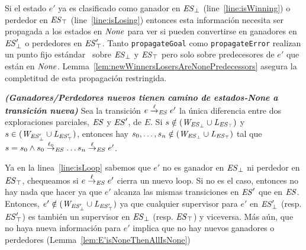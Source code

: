 Si el estado $e'$ ya es clasificado como ganador en
$\mathit{\mathit{ES}_{\bot}}$ (line~\ref{line:isWinning}) o
perdedor en $\mathit{\mathit{ES}_{\top}}$ (line~\ref{line:isLosing}) 
entonces esta información necesita ser propagada a los estados en $\mathit{None}$ para ver si pueden convertirse en ganadores en 
$\mathit{\mathit{ES}'_{\bot}}$ o perdedores en
$\mathit{\mathit{ES}'_{\top}}$. Tanto \texttt{propagateGoal} como
\texttt{propagateError} realizan un punto fijo estándar~\cite{Ramadge:1989:CDES} sobre
$\mathit{\mathit{ES}_{\bot}}$ y
$\mathit{\mathit{ES}_{\top}}$ pero solo sobre predecesores de $e'$ que están en $\mathit{None}$. 
Lemma~\ref{lem:newWinnersLosersAreNonePredecessors} asegura la completitud de esta propagación restringida.

\begin{lemma}\textbf{\emph{(Ganadores/Perdedores nuevos tienen camino de estados-\textit{None} a transición nueva)}}
\label{lem:newWinnersLosersAreNonePredecessors}
Sea la transición $e \overset{\ell}{\rightarrow}_{\mathit{ES}} e'$ la única diferencia entre dos exploraciones parciales, $\mathit{ES}$ y $\mathit{ES}'$, de $E$. Si $s \notin (\mathit{W_{\mathit{\mathit{ES}_{\bot}}}} \cup \mathit{L_{\mathit{\mathit{ES}_{\top}}}})$ y $s \in (\mathit{W_{\mathit{\mathit{ES}'_{\bot}}}} \cup \mathit{L_{\mathit{\mathit{ES}'_{\top}}}})$, entonces hay $s_0, \ldots, s_n \notin (\mathit{W_{\mathit{\mathit{ES}_{\bot}}}} \cup \mathit{L_{\mathit{\mathit{ES}_{\top}}}})$ tal que $s = s_0 \wedge
s_0 \overset{\ell_0}{\rightarrow}_{\mathit{ES}}\ldots s_{n} \overset{\ell}{\rightarrow}_{\mathit{ES}} e'$.
\end{lemma}

Ya en la linea~\ref{line:isLoop} sabemos que $e'$ no es ganador en $\mathit{\mathit{ES}_{\bot}}$ ni perdedor en $\mathit{\mathit{ES}_{\top}}$, chequeamos si $e 
\overset{\ell}{\rightarrow}_{\mathit{ES}} e'$ cierra un nuevo loop. Si no es el caso, entonces no hay nada que hacer ya que $e'$ alcanza las mismas transiciones en $\mathit{ES}'$ que en $\mathit{ES}$. Entonces, $e' \notin 
(\mathit{W_{\mathit{\mathit{ES}'_{\bot}}}} \cup \mathit{L_{\mathit{\mathit{ES}'_{\top}}}})$ ya que cualquier supervisor para $e'$ en $\mathit{\mathit{ES}'_{\bot}}$ (resp. $\mathit{\mathit{ES}'_{\top}}$) es también un supervisor en $\mathit{\mathit{ES}_{\bot}}$ (resp. 
$\mathit{\mathit{ES}_{\top}}$) y viceversa.
%
%
Más aún, que no haya nueva información para $e'$ implica que no hay nuevos ganadores o perdedores (Lemma~\ref{lem:E'isNoneThenAllIsNone})

